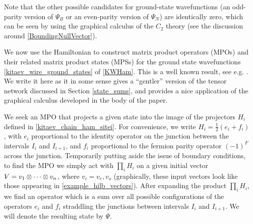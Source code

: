 Note that the other possible candidates for ground-state wavefunctions (an odd-parity version of $\Psi_B$ or an even-parity version of $\Psi_N$) are identically zero, which can be seen by using the graphical 
calculus of the $C_2$ theory (see the discussion around \eqref{BoundingNullVector}).

We now use the Hamiltonian to construct matrix product operators (MPOs) and their related matrix product states (MPSs) for the ground state wavefunctions \eqref{kitaev_wire_ground_states} of \eqref{KWHam}.
This is a well known result, see e.g. \cite{fidkowski2011,turzillo2016,bultinck2017b}.
We write it here as it in some sense gives a ``gentler'' version of the tensor network discussed in Section \ref{state_sums}, and provides a nice application of the graphical calculus developed in the body of the paper.

We seek an MPO that projects a given state into the image of the projectors $H_i$ defined in \eqref{kitaev_chain_ham_sitei}. 
For convenience, we write $H_i =\frac{1}{2}( e_{i} + f_{i})$, with $e_{i}$ proportional to the identity operator on the junction between the intervals $I_i$ and $I_{i+1}$, and $f_{i}$ proportional to the fermion parity operator $(-1)^F$ across the junction.
Temporarily putting aside the issue of boundary conditions, to find the MPO we simply act with $\prod_i H_i$ on 
a given initial vector $V = v_1\otimes \cdots \otimes v_n$, where $v_i=v_e,v_o$ (graphically, these input vectors look like those appearing in \eqref{example_hilb_vectors}).
After expanding the product $\prod_i H_i$, we find an operator which is a sum over all possible configurations of the operators $e_i$ and $f_i$ straddling the junctions between intervals $I_i$ and $I_{i+1}$. 
We will denote the resulting state by $\Psi$.

